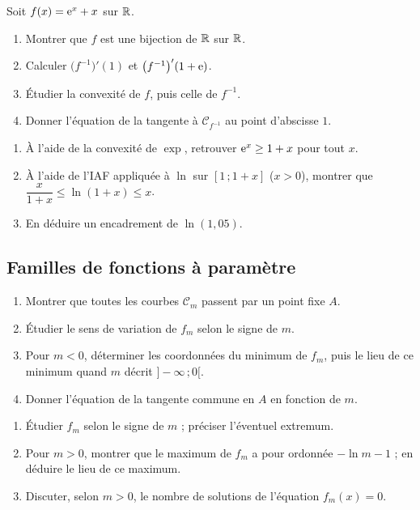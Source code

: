 Soit $f(x)=\mathrm{e}^{x}+x$ sur $\mathbb{R}$.
\begin{enumerate}
	\item Montrer que $f$ est une bijection de $\mathbb{R}$ sur $\mathbb{R}$.
	\item Calculer $\bigl(f^{-1}\bigr)'(1)$ et $\bigl(f^{-1}\bigr)'(1+\mathrm{e})$.
	\item Étudier la convexité de $f$, puis celle de $f^{-1}$.
	\item Donner l'équation de la tangente à $\mathcal C_{f^{-1}}$ au point
	d'abscisse $1$.
\end{enumerate}

\begin{enumerate}
	\item À l'aide de la convexité de $\exp$, retrouver $\mathrm{e}^{x}\geq 1+x$ pour
	tout $x$.
	\item À l'aide de l'IAF appliquée à $\ln$ sur $[1\,;1+x]$ ($x>0$), montrer
	que $\dfrac{x}{1+x}\leq \ln(1+x)\leq x$.
	\item En déduire un encadrement de $\ln(1{,}05)$.
\end{enumerate}

\subsection{Familles de fonctions à paramètre}

\begin{enumerate}
	\item Montrer que toutes les courbes $\mathcal C_m$ passent par un point
	fixe $A$.
	\item Étudier le sens de variation de $f_m$ selon le signe de $m$.
	\item Pour $m<0$, déterminer les coordonnées du minimum de $f_m$, puis le
	lieu de ce minimum quand $m$ décrit $]-\infty\,;0[$.
	\item Donner l'équation de la tangente commune en $A$ en fonction de $m$.
\end{enumerate}

\begin{enumerate}
	\item Étudier $f_m$ selon le signe de $m$ ; préciser l'éventuel extremum.
	\item Pour $m>0$, montrer que le maximum de $f_m$ a pour ordonnée
	$-\ln m-1$ ; en déduire le lieu de ce maximum.
	\item Discuter, selon $m>0$, le nombre de solutions de l'équation
	$f_m(x)=0$.
\end{enumerate}

